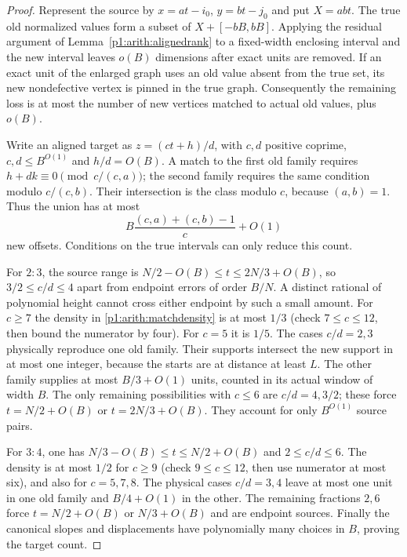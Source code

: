 \begin{proof}
Represent the source by $x=at-i_0$, $y=bt-j_0$ and put $X=abt$.
The true old normalized values form a subset of
$X+[-bB,bB]$.  Applying the residual argument of
Lemma~\ref{p1:arith:alignedrank} to a fixed-width enclosing interval and
the new interval leaves $o(B)$ dimensions after exact units are removed.
If an exact unit of the enlarged graph uses an old value absent from the
true set, its new nondefective vertex is pinned in the true graph.
Consequently the remaining loss is at most the number of new vertices
matched to actual old values, plus $o(B)$.

Write an aligned target as $z=(ct+h)/d$, with $c,d$ positive coprime,
$c,d\leq B^{O(1)}$ and $h/d=O(B)$.  A match to the first old family
requires
$h+dk\equiv0\pmod{c/(c,a)}$; the second family requires the same
condition modulo $c/(c,b)$.  Their intersection is the class modulo $c$,
because $(a,b)=1$.  Thus the union has at most
\begin{equation}\label{p1:arith:matchdensity}
 B\frac{(c,a)+(c,b)-1}{c}+O(1)
\end{equation}
new offsets.  Conditions on the true intervals can only reduce this count.

For $2:3$, the source range is
$N/2-O(B)\leq t\leq2N/3+O(B)$, so $3/2\leq c/d\leq4$ apart
from endpoint errors of order $B/N$.  A distinct rational of polynomial
height cannot cross either endpoint by such a small amount.
For $c\geq7$ the density in \eqref{p1:arith:matchdensity} is at most
$1/3$ (check $7\leq c\leq12$, then bound the numerator by four).
For $c=5$ it is $1/5$.  The cases $c/d=2,3$ physically reproduce one
old family.  Their supports intersect the new support in at most one
integer, because the starts are at distance at least $L$.  The other
family supplies at most $B/3+O(1)$ units, counted in its actual window
of width $B$.  The only remaining possibilities with $c\leq6$ are
$c/d=4,3/2$; these force $t=N/2+O(B)$ or $t=2N/3+O(B)$.
They account for only $B^{O(1)}$ source pairs.

For $3:4$, one has $N/3-O(B)\leq t\leq N/2+O(B)$ and
$2\leq c/d\leq6$.  The density is at most $1/2$ for $c\geq9$
(check $9\leq c\leq12$, then use numerator at most six), and also
for $c=5,7,8$.  The physical cases $c/d=3,4$ leave at most one unit
in one old family and $B/4+O(1)$ in the other.  The remaining fractions
$2,6$ force $t=N/2+O(B)$ or $N/3+O(B)$ and are endpoint sources.
Finally the canonical slopes and displacements have polynomially many
choices in $B$, proving the target count.
\end{proof}

